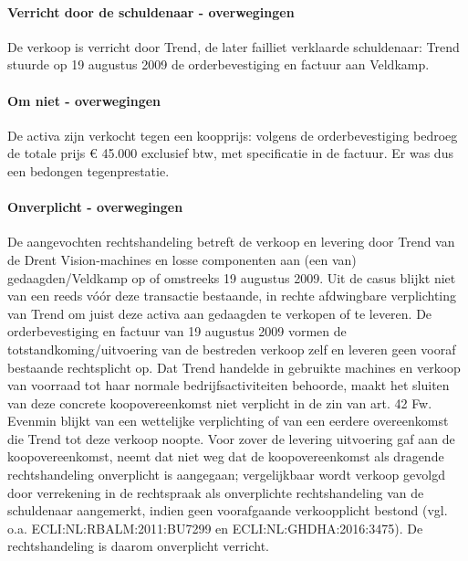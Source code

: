 \documentclass[
  dutch,
  a4paper,
]{article}
\begin{document}
\paragraph{Verricht door de schuldenaar - overwegingen}\label{verricht-door-de-schuldenaar---overwegingen-70}

De verkoop is verricht door Trend, de later failliet verklaarde schuldenaar: Trend stuurde op 19 augustus 2009 de orderbevestiging en factuur aan Veldkamp.

\paragraph{Om niet - overwegingen}\label{om-niet---overwegingen-70}

De activa zijn verkocht tegen een koopprijs: volgens de orderbevestiging bedroeg de totale prijs € 45.000 exclusief btw, met specificatie in de factuur. Er was dus een bedongen tegenprestatie.

\paragraph{Onverplicht - overwegingen}\label{onverplicht---overwegingen-70}

De aangevochten rechtshandeling betreft de verkoop en levering door Trend van de Drent Vision-machines en losse componenten aan (een van) gedaagden/Veldkamp op of omstreeks 19 augustus 2009. Uit de casus blijkt niet van een reeds vóór deze transactie bestaande, in rechte afdwingbare verplichting van Trend om juist deze activa aan gedaagden te verkopen of te leveren. De orderbevestiging en factuur van 19 augustus 2009 vormen de totstandkoming/uitvoering van de bestreden verkoop zelf en leveren geen vooraf bestaande rechtsplicht op. Dat Trend handelde in gebruikte machines en verkoop van voorraad tot haar normale bedrijfsactiviteiten behoorde, maakt het sluiten van deze concrete koopovereenkomst niet verplicht in de zin van art. 42 Fw. Evenmin blijkt van een wettelijke verplichting of van een eerdere overeenkomst die Trend tot deze verkoop noopte. Voor zover de levering uitvoering gaf aan de koopovereenkomst, neemt dat niet weg dat de koopovereenkomst als dragende rechtshandeling onverplicht is aangegaan; vergelijkbaar wordt verkoop gevolgd door verrekening in de rechtspraak als onverplichte rechtshandeling van de schuldenaar aangemerkt, indien geen voorafgaande verkoopplicht bestond (vgl. o.a. ECLI:NL:RBALM:2011:BU7299 en ECLI:NL:GHDHA:2016:3475). De rechtshandeling is daarom onverplicht verricht.
\end{document}
